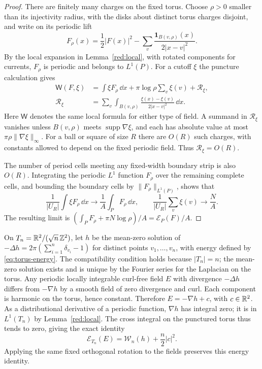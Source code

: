 \begin{proof}
There are finitely many charges on the fixed torus.  Choose
$\rho>0$ smaller than its injectivity radius, with the disks about
distinct torus charges disjoint, and write on its periodic lift
\[
 F_\rho(x)=\frac12|F(x)|^2-
       \sum_v\frac{\mathbf1_{B(v,\rho)}(x)}{2|x-v|^2}.
\]
By the local expansion in Lemma~\ref{red:local}, with rotated
components for currents, $F_\rho$ is periodic and belongs to
$L^1(P)$.  For a cutoff $\xi$ the puncture calculation gives
\begin{align*}
 \mathsf W(F,\xi)
 &=\int\xi F_\rho\,\dd x+\pi\log\rho\sum_v\xi(v)+\mathcal R_\xi,\\
 \mathcal R_\xi
 &=\sum_v\int_{B(v,\rho)}
             \frac{\xi(x)-\xi(v)}{2|x-v|^2}\,\dd x.
\end{align*}
Here $\mathsf W$ denotes the same local formula for either type of
field.  A summand in $\mathcal R_\xi$ vanishes unless
$B(v,\rho)$ meets $\operatorname{supp}\nabla\xi$, and each has
absolute value at most $\pi\rho\|\nabla\xi\|_\infty$.
For a ball or square of size $R$ there are $O(R)$ such charges,
with constants allowed to depend on the fixed periodic field.
Thus $\mathcal R_\xi=O(R)$.

The number of period cells meeting any fixed-width boundary strip
is also $O(R)$.  Integrating the periodic $L^1$ function
$F_\rho$ over the remaining complete cells, and bounding the
boundary cells by $\|F_\rho\|_{L^1(P)}$, shows that
\[
 \frac1{|U_R|}\int\xi F_\rho\,\dd x
       \longrightarrow\frac1A\int_PF_\rho\,\dd x,
 \qquad
 \frac1{|U_R|}\sum_v\xi(v)\longrightarrow\frac NA.
\]
The resulting limit is
$(\int_PF_\rho+\pi N\log\rho)/A=\mathcal E_P(F)/A$.
\end{proof}

On $T_n=\mathbb R^2/(\sqrt n\,\mathbb Z^2)$, let $h$ be the mean-zero solution
of $-\Delta h=2\pi(\sum_{i=1}^n\delta_{v_i}-1)$ for distinct points
$v_1,\ldots,v_n$, with energy defined by \eqref{eq:torus-energy}.
The compatibility condition holds because $|T_n|=n$;
the mean-zero solution exists and is unique by the Fourier series
for the Laplacian on the torus.
Any periodic locally integrable curl-free field $E$ with divergence
$-\Delta h$ differs from
$-\nabla h$ by a smooth field of zero divergence and curl.
Each component is harmonic on the torus, hence constant.  Therefore
$E=-\nabla h+c$, with $c\in\mathbb R^2$.  As a distributional derivative
of a periodic function, $\nabla h$ has integral zero; it is in
$L^1(T_n)$ by Lemma~\ref{red:local}.  The cross integral on the
punctured torus thus tends to zero, giving the exact identity
\begin{equation}\label{red:harmonic}
 \mathcal E_{T_n}(E)=\mathcal W_n(h)+\frac n2|c|^2.
\end{equation}
Applying the same fixed orthogonal rotation to the fields preserves
this energy identity.

